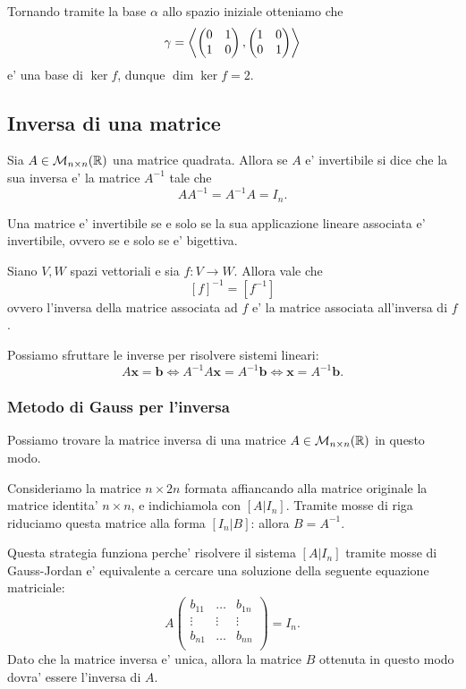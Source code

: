 \begin{solution}
\begin{enumerate}
        Tornando tramite la base $\alpha$ allo spazio iniziale otteniamo che \[
            \gamma = \left\langle \begin{pmatrix} 0 & 1 \\ 1 & 0 \end{pmatrix}, \begin{pmatrix} 1 & 0 \\ 0 & 1 \end{pmatrix} \right\rangle  
        \] e' una base di $\ker f$, dunque $\dim \ker f = 2$.
    \end{enumerate}
\end{solution}

\subsection{Inversa di una matrice}

\begin{definition}
    Sia $A \in \mathcal{M}_{n \times n}(\mathbb{R})$ una matrice quadrata. Allora se $A$ e' invertibile si dice che la sua inversa e' la matrice $A^{-1}$ tale che \[
        AA^{-1} = A^{-1}A = I_n.
    \]
\end{definition}

Una matrice e' invertibile se e solo se la sua applicazione lineare associata e' invertibile, ovvero se e solo se e' bigettiva.

\begin{proposition}
    Siano $V, W$ spazi vettoriali e sia $f : V \to W$. Allora vale che \[
        [f]^{-1} = [f^{-1}]    
    \] ovvero l'inversa della matrice associata ad $f$ e' la matrice associata all'inversa di $f$.
\end{proposition}

Possiamo sfruttare le inverse per risolvere sistemi lineari: \[
    A\bm x = \bm b \iff A^{-1}A\bm x = A^{-1}\bm b \iff \bm x = A^{-1}\bm b.
\]

\subsubsection{Metodo di Gauss per l'inversa}
Possiamo trovare la matrice inversa di una matrice $A \in  \mathcal{M}_{n \times n}(\mathbb{R})$ in questo modo. 

Consideriamo la matrice $n \times 2n$ formata affiancando alla matrice originale la matrice identita' $n \times n$, e indichiamola con $[A | I_n]$. Tramite mosse di riga riduciamo questa matrice alla forma $[I_n | B]$: allora $B = A^{-1}$.

Questa strategia funziona perche' risolvere il sistema $[A | I_n]$ tramite mosse di Gauss-Jordan e' equivalente a cercare una soluzione della seguente equazione matriciale: \[
    A\begin{pmatrix}
        b_{11} & \dots & b_{1n} \\
        \vdots & \vdots & \vdots \\
        b_{n1} & \dots & b_{nn} \\
    \end{pmatrix} = I_n.
\] Dato che la matrice inversa e' unica, allora la matrice $B$ ottenuta in questo modo dovra' essere l'inversa di $A$.

